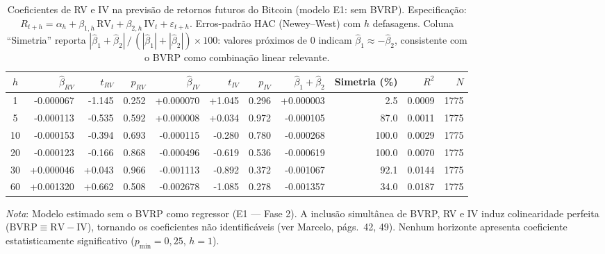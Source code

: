 \begin{table}[H]
\centering
\caption{Coeficientes de RV e IV na previs\~ao de retornos futuros do Bitcoin (modelo E1: sem BVRP). Especifica\c{c}\~ao: $R_{t+h} = \alpha_h + \beta_{1,h}\,\text{RV}_t + \beta_{2,h}\,\text{IV}_t + \varepsilon_{t+h}$. Erros-padr\~ao HAC (Newey--West) com $h$ defasagens. Coluna ``Simetria'' reporta $|\hat{\beta}_1 + \hat{\beta}_2| \,/\,(|\hat{\beta}_1| + |\hat{\beta}_2|) \times 100$: valores pr\'{o}ximos de 0 indicam $\hat{\beta}_1 \approx -\hat{\beta}_2$, consistente com o BVRP como combina\c{c}\~ao linear relevante.}
\label{tab:ols_rv_iv_multihoriz}
\footnotesize
\begin{adjustbox}{max width=\textwidth}
\begin{tabular}{crrrrrrrrrr}
\toprule
$h$ & $\hat{\beta}_{RV}$ & $t_{RV}$ & $p_{RV}$ & $\hat{\beta}_{IV}$ & $t_{IV}$ & $p_{IV}$ & $\hat{\beta}_1{+}\hat{\beta}_2$ & Simetria (\%) & $R^2$ & $N$ \\
\midrule
  1 & -0.000067 & -1.145 & 0.252 & +0.000070 & +1.045 & 0.296 & +0.000003 & 2.5 & 0.0009 & 1775 \\
  5 & -0.000113 & -0.535 & 0.592 & +0.000008 & +0.034 & 0.972 & -0.000105 & 87.0 & 0.0011 & 1775 \\
 10 & -0.000153 & -0.394 & 0.693 & -0.000115 & -0.280 & 0.780 & -0.000268 & 100.0 & 0.0029 & 1775 \\
 20 & -0.000123 & -0.166 & 0.868 & -0.000496 & -0.619 & 0.536 & -0.000619 & 100.0 & 0.0070 & 1775 \\
 30 & +0.000046 & +0.043 & 0.966 & -0.001113 & -0.892 & 0.372 & -0.001067 & 92.1 & 0.0144 & 1775 \\
 60 & +0.001320 & +0.662 & 0.508 & -0.002678 & -1.085 & 0.278 & -0.001357 & 34.0 & 0.0187 & 1775 \\
\bottomrule
\end{tabular}
\end{adjustbox}
\smallskip
\begin{minipage}{0.96\linewidth}
\footnotesize\textit{Nota}: Modelo estimado sem o BVRP como regressor (E1 --- Fase 2). A inclus\~ao simult\^anea de BVRP, RV e IV induz colinearidade perfeita ($\text{BVRP} \equiv \text{RV} - \text{IV}$), tornando os coeficientes n\~ao identific\'aveis (ver Marcelo, p\'ags.\ 42, 49). Nenhum horizonte apresenta coeficiente estatisticamente significativo ($p_{\min} = 0{,}25$, $h = 1$).
\end{minipage}
\end{table}
